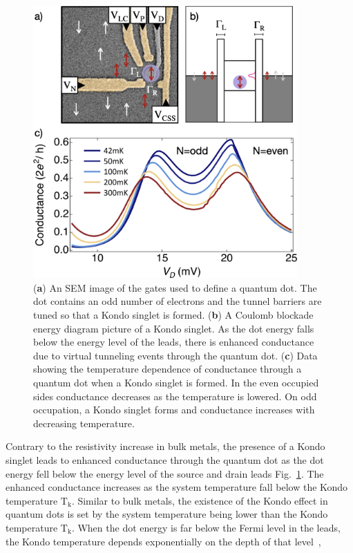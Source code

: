  
\begin{figure}[!hbt]
  \begin{center}
    \includegraphics[width=0.9\textwidth]{figures/ch2/crop_FiguresMaster.011.png}
    \caption[Kondo effect in a quantum dot in the Kondo regime]{\label{fig:ch2/kondo_regime_conductance} 
    (\textbf{a}) An SEM image of the gates used to define a quantum dot. The dot contains an odd number of electrons and the tunnel barriers are tuned so that a Kondo singlet is formed. (\textbf{b}) A Coulomb blockade energy diagram picture of a Kondo singlet. As the dot energy falls below the energy level of the leads, there is enhanced conductance due to virtual tunneling events through the quantum dot. (\textbf{c}) Data showing the temperature dependence of conductance through a quantum dot when a Kondo singlet is formed. In the even occupied sides conductance decreases as the temperature is lowered. On odd occupation, a Kondo singlet forms and conductance increases with decreasing temperature.}
  \end{center}
\end{figure}


 Contrary to the resistivity increase in bulk metals, the presence of a Kondo singlet leads to enhanced conductance through the quantum dot as the dot energy fell below the energy level of the source and drain leads Fig.~\ref{fig:ch2/kondo_regime_conductance}. The enhanced conductance increases as the system temperature fall below the Kondo temperature $\mathrm{T_k}$. Similar to bulk metals, the existence of the Kondo effect in quantum dots is set by the system temperature being lower than the Kondo temperature $\mathrm{T_k}$. When the dot energy is far below the Fermi level in the leads, the Kondo temperature depends exponentially on the depth of that level~\cite{goldhaber_mv}, 

